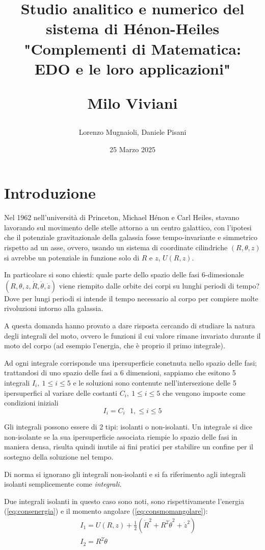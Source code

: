 \documentclass[a4paper, 12pt]{article}
\title{
	Studio analitico e numerico del sistema di Hénon-Heiles\\
	\vspace{1cm}	
	"Complementi di Matematica: EDO e le loro applicazioni"\\
	\begin{large}
		Milo Viviani
	\end{large}
	\vspace{1cm}

}
\date{25 Marzo 2025}
\author{Lorenzo Mugnaioli, Daniele Pisani}
\numberwithin{equation}{section}
\numberwithin{figure}{section}
\begin{document}
\maketitle
\clearpage
\tableofcontents
\clearpage

\section{Introduzione}
Nel 1962 nell'università di Princeton, Michael Hénon e  Carl Heiles,
stavano lavorando sul movimento delle stelle attorno a un centro galattico,
con l'ipotesi che il potenziale gravitazionale della galassia fosse tempo-invariante e simmetrico
rispetto ad un asse, ovvero, usando un sistema di coordinate cilindriche $(R,\theta,z)$ si avrebbe 
un potenziale in funzione solo di $R$ e $z$, $U(R,z)$.

In particolare si sono chiesti:
quale parte dello spazio delle fasi 6-dimesionale $(R,\theta,z, \dot{R},\dot{\theta}, \dot{z})$
viene riempito dalle orbite dei corpi su lunghi periodi di tempo? \cite{1964henonheiles}
Dove per lungi periodi si intende il tempo necessario al corpo per compiere molte rivoluzioni
intorno alla galassia.

A questa domanda hanno provato a dare risposta cercando di studiare la natura degli integrali del moto,
ovvero le funzioni il cui valore rimane invariato durante il moto del corpo (ad esempio l'energia,
che è proprio il primo integrale).

Ad ogni integrale corrisponde una ipersuperficie conetnuta nello spazio delle fasi; trattandosi di uno spazio
delle fasi a 6 dimensioni, sappiamo che esitono 5 integrali $I_i,\ 1\le i\le 5$ e le soluzioni
sono contenute nell'intersezione delle 5 ipersuperfici al variare delle costanti
$C_i,\ 1\le i\le 5$ che vengono imposte come condizioni iniziali
\begin{equation}
	I_i = C_i\ \ \  1,\le i\le 5
\end{equation}

Gli integrali possono essere di 2 tipi: isolanti o non-isolanti. Un integrale si dice non-isolante
se la sua ipersuperficie associata riempie lo spazio delle fasi in maniera densa, risulta quindi inutile
ai fini pratici per stabilire un confine per il sostegno della soluzione nel tempo.

Di norma si ignorano gli integrali non-isolanti e si fa riferimento agli integrali isolanti semplicemente
come \textit{integrali}.

Due integrali isolanti in questo caso sono noti, sono rispettivamente l'energia (\ref{eq:consenergia})
e il momento angolare (\ref{eq:consmomangolare}):
\begin{eqnarray}
	&&I_1 = U(R,z) + \frac{1}{2}(\dot{R}^2+R^2\dot{\theta}^2+\dot{z}^2) \label{eq:consenergia}\\
	&&I_2 = R^2\dot{\theta} \label{eq:consmomangolare}
\end{eqnarray}
\end{document}
